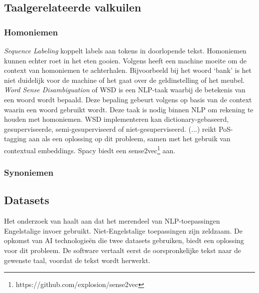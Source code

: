 \subsection{Taalgerelateerde valkuilen}

\subsubsection{Homoniemen}

\textit{Sequence Labeling} koppelt labels aan tokens in doorlopende tekst. Homoniemen kunnen echter roet in het eten gooien. Volgens \textcite{Roldos2020} heeft een machine moeite om de context van homoniemen te achterhalen. Bijvoorbeeld bij het woord ‘bank’ is het niet duidelijk voor de machine of het gaat over de geldinstelling of het meubel. \textit{Word Sense Disambiguation} of WSD is een NLP-taak waarbij de betekenis van een woord wordt bepaald. Deze bepaling gebeurt volgens \autocite{Eisenstein2019} op basis van de context waarin een woord gebruikt wordt. Deze taak is nodig binnen NLP om rekening te houden met homoniemen. WSD implementeren kan dictionary-gebaseerd, gesuperviseerde, semi-gesuperviseerd of niet-gesuperviseerd. (...) reikt PoS-tagging aan als een oplossing op dit probleem, samen met het gebruik van contextual embeddings. Spacy biedt een sense2vec\footnote{https://github.com/explosion/sense2vec} aan.

\subsubsection{Synoniemen}



\subsection{Datasets}

Het onderzoek van \textcite{Sciforce2020} haalt aan dat het merendeel van NLP-toepassingen Engelstalige invoer gebruikt. Niet-Engelstalige toepassingen zijn zeldzaam. De opkomst van AI technologieën die twee datasets gebruiken, biedt een oplossing voor dit probleem. De software vertaalt eerst de oorspronkelijke tekst naar de gewenste taal, voordat de tekst wordt herwerkt. 

